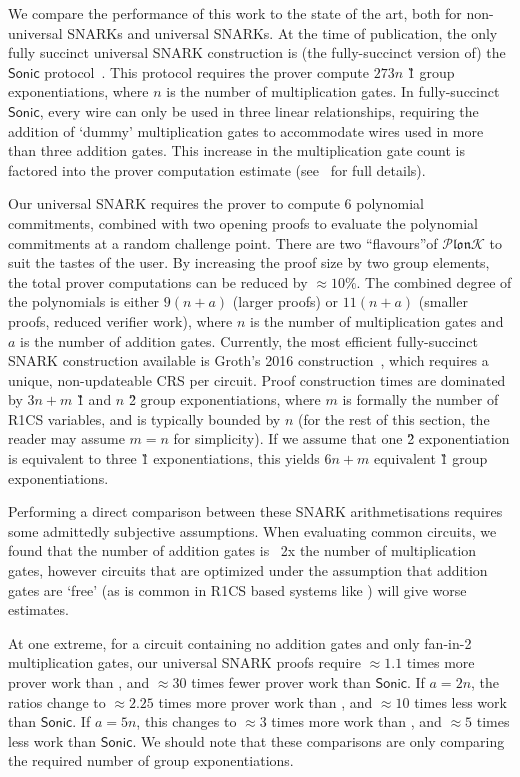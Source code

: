 \documentclass[11pt]{article} %
\newcommand{\plonk}{\ensuremath{\mathcal{P} \mathfrak{lon}\mathcal{K}}\xspace}
\newcommand{\sonic}{\ensuremath{\mathsf{Sonic}}\xspace}
\begin{document}
We compare the performance of this work to the state of the art, both for non-universal SNARKs and universal SNARKs. At the time of publication, the only fully succinct universal SNARK construction is (the fully-succinct version of) the \sonic protocol~\cite{sonic}. This protocol requires the prover compute $273n$ \G1 group exponentiations, where $n$ is the number of multiplication gates. In fully-succinct \sonic, every wire can only be used in three linear relationships, requiring the addition of `dummy' multiplication gates to accommodate wires used in more than three addition gates. This increase in the multiplication gate count is factored into the prover computation estimate (see~\cite{sonic} for full details).

Our universal SNARK requires the prover to compute 6 polynomial commitments, combined with two opening proofs to evaluate the polynomial commitments at a random challenge point. There are two ``flavours''of \plonk to suit the tastes of the user. By increasing the proof size by two group elements, the total prover computations can be reduced by $\approx10\%$. The combined degree of the polynomials is either $9(n + a)$ (larger proofs) or $11(n + a)$ (smaller proofs, reduced verifier work), where $n$ is the number of multiplication gates and $a$ is the number of addition gates.
Currently, the most efficient fully-succinct SNARK construction available is Groth's 2016 construction~\cite{Groth16}, which requires a unique, non-updateable CRS per circuit. Proof construction times are dominated by $3n + m$ \G1 and $n$ \G2 group exponentiations, where $m$ is formally the number of R1CS variables, and is typically bounded by $n$ (for the rest of this section, the reader may assume $m=n$ for simplicity). If we assume that one \G2 exponentiation is equivalent to three \G1 exponentiations, this yields $6n + m$ equivalent \G1 group exponentiations.


Performing a direct comparison between these SNARK arithmetisations requires some admittedly subjective assumptions. When evaluating common circuits, we found that the number of addition gates is ~2x the number of multiplication gates, however circuits that are optimized under the assumption that addition gates are `free' (as is common in R1CS based systems like \cite{Groth16}) will give worse estimates.

At one extreme, for a circuit containing no addition gates and only fan-in-2 multiplication gates, our universal SNARK proofs require $\approx 1.1$ times more prover work than \cite{Groth16}, and $\approx 30$ times fewer prover work than \sonic. If $a = 2n$, the ratios change to $\approx 2.25$ times more prover work than \cite{Groth16}, and $\approx 10$ times less work than \sonic. If $a = 5n$, this changes to $\approx3$ times more work than \cite{Groth16}, and $\approx 5$ times less work than \sonic. We should note that these comparisons are only comparing the required number of group exponentiations.
\end{document}

